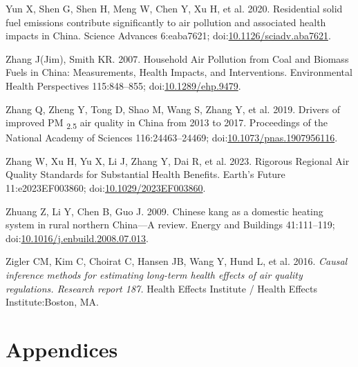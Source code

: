 \documentclass[
  letterpaper,
  DIV=11,
  numbers=noendperiod]{scrartcl}
\newlength{\cslhangindent}
\newlength{\cslentryspacingunit} %
\newenvironment{CSLReferences}[2] %
 {%
  \setlength{\parindent}{0pt}
  \ifodd #1
  \let\oldpar\par
  \def\par{\hangindent=\cslhangindent\oldpar}
  \fi
  \setlength{\parskip}{#2\cslentryspacingunit}
 }%
 {}
\begin{document}
\begin{CSLReferences}{1}{0}
\leavevmode{}%
Yun X, Shen G, Shen H, Meng W, Chen Y, Xu H, et al. 2020. Residential
solid fuel emissions contribute significantly to air pollution and
associated health impacts in {China}. Science Advances 6:eaba7621;
doi:\href{https://doi.org/10.1126/sciadv.aba7621}{10.1126/sciadv.aba7621}.

\leavevmode{}%
Zhang J(Jim), Smith KR. 2007. Household {Air Pollution} from {Coal} and
{Biomass Fuels} in {China}: {Measurements}, {Health Impacts}, and
{Interventions}. Environmental Health Perspectives 115:848--855;
doi:\href{https://doi.org/10.1289/ehp.9479}{10.1289/ehp.9479}.

\leavevmode{}%
Zhang Q, Zheng Y, Tong D, Shao M, Wang S, Zhang Y, et al. 2019. Drivers
of improved {PM} {\textsubscript{2.5}} air quality in {China} from 2013
to 2017. Proceedings of the National Academy of Sciences
116:24463--24469;
doi:\href{https://doi.org/10.1073/pnas.1907956116}{10.1073/pnas.1907956116}.

\leavevmode{}%
Zhang W, Xu H, Yu X, Li J, Zhang Y, Dai R, et al. 2023. Rigorous
{Regional Air Quality Standards} for {Substantial Health Benefits}.
Earth's Future 11:e2023EF003860;
doi:\href{https://doi.org/10.1029/2023EF003860}{10.1029/2023EF003860}.

\leavevmode{}%
Zhuang Z, Li Y, Chen B, Guo J. 2009. Chinese kang as a domestic heating
system in rural northern {China}---{A} review. Energy and Buildings
41:111--119;
doi:\href{https://doi.org/10.1016/j.enbuild.2008.07.013}{10.1016/j.enbuild.2008.07.013}.

\leavevmode{}%
Zigler CM, Kim C, Choirat C, Hansen JB, Wang Y, Hund L, et al. 2016.
\emph{Causal inference methods for estimating long-term health effects
of air quality regulations. {Research} report 187.} Health Effects
Institute / Health Effects Institute:Boston, MA.

\end{CSLReferences}

\newpage
\appendix
\renewcommand{\thefigure}{A\arabic{figure}}
\renewcommand{\thetable}{A\arabic{table}}
\setcounter{figure}{0}
\setcounter{table}{0}

\hypertarget{appendices}{%
\section{Appendices}\label{appendices}}
\end{document}
